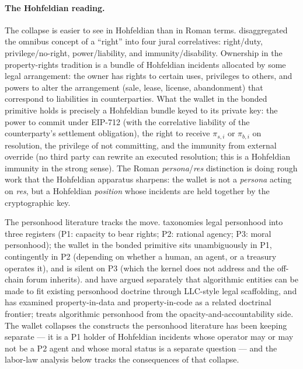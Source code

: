 \documentclass[11pt,a4paper]{article}
\theoremstyle{remark}
\begin{document}
\paragraph{The Hohfeldian reading.}
The collapse is easier to see in Hohfeldian than in Roman terms.
\citet{hohfeld1913fundamental} disaggregated the omnibus concept
of a ``right'' into four jural correlatives: right/duty,
privilege/no-right, power/liability, and immunity/disability.
Ownership in the property-rights tradition is a bundle of
Hohfeldian incidents allocated by some legal arrangement: the
owner has rights to certain uses, privileges to others, and
powers to alter the arrangement (sale, lease, license,
abandonment) that correspond to liabilities in counterparties.
What the wallet in the bonded primitive holds is precisely a
Hohfeldian bundle keyed to its private key: the power to commit
under EIP-712 (with the correlative liability of the
counterparty's settlement obligation), the right to receive
$\pi_{s,i}$ or $\pi_{b,i}$ on resolution, the privilege of not
committing, and the immunity from external override (no third
party can rewrite an executed resolution; this is a Hohfeldian
immunity in the strong sense). The Roman \emph{persona}/\emph{res}
distinction is doing rough work that the Hohfeldian apparatus
sharpens: the wallet is not a \emph{persona} acting on
\emph{res}, but a Hohfeldian \emph{position} whose incidents are
held together by the cryptographic key.

The personhood literature tracks the move.
\citet{naffine_law_2009} taxonomies legal personhood into three
registers (P1: capacity to bear rights; P2: rational agency; P3:
moral personhood); the wallet in the bonded primitive sits
unambiguously in P1, contingently in P2 (depending on whether a
human, an agent, or a treasury operates it), and is silent on P3
(which the kernel does not address and the off-chain forum
inherits).
\citet{bayern_2014} and \citet{lopucki2017algorithmic} have
argued separately that algorithmic entities can be made to fit
existing personhood doctrine through LLC-style legal scaffolding,
and \citet{fairfield2017owned} has examined property-in-data and
property-in-code as a related doctrinal frontier;
\citet{pasquale2015blackbox} treats algorithmic personhood from
the opacity-and-accountability side. The wallet collapses the
constructs the personhood literature has been keeping
separate --- it is a P1 holder of Hohfeldian incidents whose
operator may or may not be a P2 agent and whose moral status is
a separate question --- and the labor-law analysis below tracks
the consequences of that collapse.
\end{document}
